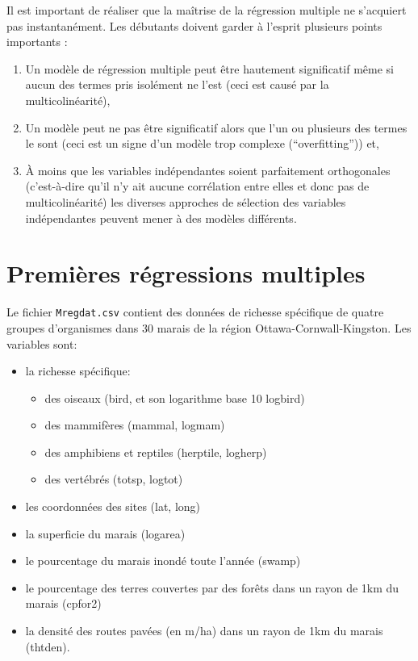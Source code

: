 \documentclass[
  12pt,
]{book}
\providecommand{\tightlist}{%
  \setlength{\itemsep}{0pt}\setlength{\parskip}{0pt}}
\begin{document}
Il est important de réaliser que la maîtrise de la régression multiple ne s'acquiert pas instantanément. Les débutants doivent garder à l'esprit plusieurs points importants :

\begin{enumerate}
\def\labelenumi{\arabic{enumi}.}
\tightlist
\item
  Un modèle de régression multiple peut être hautement significatif même si aucun des termes pris isolément ne l'est (ceci est causé par la multicolinéarité),
\item
  Un modèle peut ne pas être significatif alors que l'un ou plusieurs des termes le sont (ceci est un signe d'un modèle trop complexe (``overfitting'')) et,
\item
  À moins que les variables indépendantes soient parfaitement orthogonales (c'est-à-dire qu'il n'y ait aucune corrélation entre elles et donc pas de multicolinéarité) les diverses approches de sélection des variables indépendantes peuvent mener à des modèles différents.
\end{enumerate}

\hypertarget{premiuxe8res-ruxe9gressions-multiples}{%
\section{Premières régressions multiples}\label{premiuxe8res-ruxe9gressions-multiples}}

Le fichier \texttt{Mregdat.csv} contient des données de richesse spécifique de quatre groupes d'organismes dans 30 marais de la région Ottawa-Cornwall-Kingston. Les variables sont:

\begin{itemize}
\tightlist
\item
  la richesse spécifique:

  \begin{itemize}
  \tightlist
  \item
    des oiseaux (bird, et son logarithme base 10 logbird)
  \item
    des mammifères (mammal, logmam)
  \item
    des amphibiens et reptiles (herptile, logherp)
  \item
    des vertébrés (totsp, logtot)
  \end{itemize}
\item
  les coordonnées des sites (lat, long)
\item
  la superficie du marais (logarea)
\item
  le pourcentage du marais inondé toute l'année (swamp)
\item
  le pourcentage des terres couvertes par des forêts dans un rayon de 1km du marais (cpfor2)
\item
  la densité des routes pavées (en m/ha) dans un rayon de 1km du marais (thtden).
\end{itemize}
\end{document}
